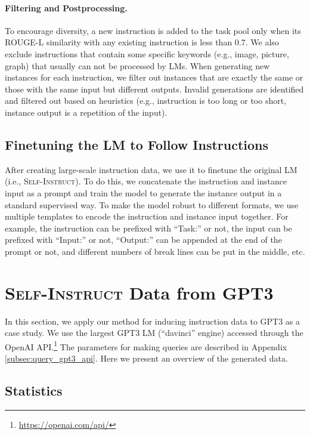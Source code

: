 \documentclass[11pt]{article}
\newcommand{\name}{\textsc{Self-Instruct}}
\newcommand{\gptthree}{\textsc{GPT3}}
\begin{document}
\paragraph{Filtering and Postprocessing.}
\label{subsec:filtering}
To encourage diversity, a new instruction is added to the task pool only when its ROUGE-L similarity with any existing instruction is less than 0.7. 
We also exclude instructions that contain some specific keywords (e.g., image, picture, graph) that usually can not be processed by LMs. When generating new instances for each instruction, we filter out instances that are exactly the same or those with the same input but different outputs. Invalid generations are identified and filtered out based on heuristics (e.g., instruction is too long or too short, instance output is a repetition of the input). 


\subsection{Finetuning the LM to Follow Instructions}
\label{subsec:instruction-tuning}
After creating large-scale instruction data, we use it to finetune the original LM (i.e., \name{}). To do this, we concatenate the instruction and instance input as a prompt and train the model to generate the instance output in a standard supervised way. To make the model robust to different formats, we use multiple templates to encode the instruction and instance input together. For example, the instruction can be prefixed with ``Task:'' or not, the input can be prefixed with ``Input:'' or not, ``Output:'' can be appended at the end of the prompt or not, and different numbers of break lines can be put in the middle, etc.




\section{\name{} Data from \gptthree{}}
\label{sec:generatd-data}

 In this section, we apply our method for inducing instruction data to \gptthree{} as a case study. We use the largest GPT3 LM (``davinci'' engine) accessed through the OpenAI API.\footnote{\url{https://openai.com/api/}} The parameters for making queries are described in Appendix \ref{subsec:query_gpt3_api}. Here we present an overview of the generated data.

\subsection{Statistics}
\label{subsec:statistics}
\end{document}

